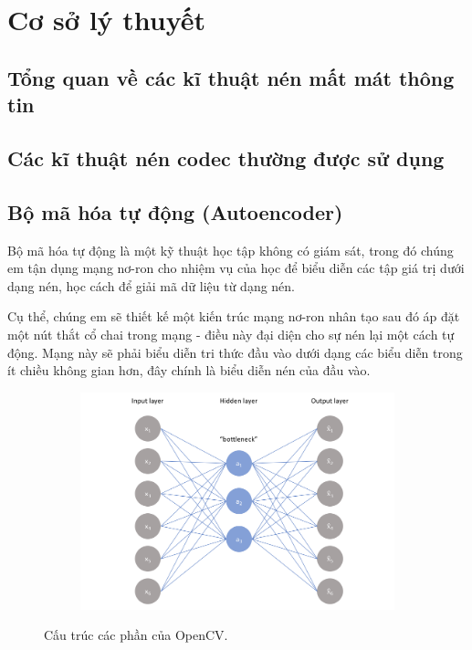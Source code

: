 \chapter{Cơ sở lý thuyết}
\label{cha: chap2}

\section{Tổng quan về các kĩ thuật nén mất mát thông tin}

\section{Các kĩ thuật nén codec thường được sử dụng}

\section{Bộ mã hóa tự động (Autoencoder)}

Bộ mã hóa tự động là một kỹ thuật học tập không có giám sát,
trong đó chúng em tận dụng mạng nơ-ron cho nhiệm vụ của học để biểu diễn các tập
giá trị dưới dạng nén, học cách để giải mã dữ liệu từ dạng nén.

Cụ thể, chúng em sẽ thiết kế một kiến trúc mạng nơ-ron nhân tạo sau đó áp đặt một
nút thắt cổ chai trong mạng - điều này đại diện cho sự nén lại một cách tự động.
Mạng này sẽ phải biểu diễn tri thức đầu vào dưới dạng các biểu diễn trong ít
chiều không gian hơn, đây chính là biểu diễn nén của đầu vào.

\begin{figure}
    \begin{subfigure}{1.\textwidth}
        \includegraphics[width=1.\linewidth]{Chapters/items/autoencoder1.png}
        \caption{}
        \label{fig: auto1}
    \end{subfigure}
    \caption{Cấu trúc các phần của OpenCV.}
\end{figure}

